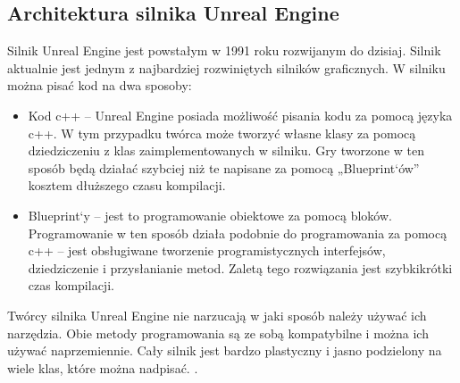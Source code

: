 \documentclass[12pt,twoside]{article}
\begin{document}
\subsection{Architektura silnika Unreal Engine}
Silnik Unreal Engine jest powstałym w 1991 roku rozwijanym do dzisiaj. Silnik
aktualnie jest jednym z najbardziej rozwiniętych silników graficznych. W silniku
można pisać kod na dwa sposoby: 
\begin{itemize}
\item Kod c++ -- Unreal Engine posiada możliwość pisania kodu za pomocą języka
c++. W tym przypadku twórca może tworzyć własne klasy za pomocą dziedziczeniu z
klas zaimplementowanych w silniku. Gry tworzone w ten sposób będą działać
szybciej niż te napisane za pomocą „Blueprint`ów” kosztem dłuższego czasu kompilacji. 
\item Blueprint`y -- jest to programowanie obiektowe za pomocą bloków.
Programowanie w ten sposób działa podobnie do programowania za pomocą c++ -- jest
obsługiwane tworzenie programistycznych interfejsów, dziedziczenie i
przysłanianie metod. Zaletą tego rozwiązania jest szybkikrótki czas kompilacji.
\end{itemize}

Twórcy silnika Unreal Engine nie narzucają w jaki sposób należy używać ich
narzędzia. Obie metody programowania są ze sobą kompatybilne i można ich używać
naprzemiennie. Cały silnik jest bardzo plastyczny i jasno podzielony na wiele
klas, które można nadpisać. \cite{UnrealEngineArchitecture}. 
\end{document}
